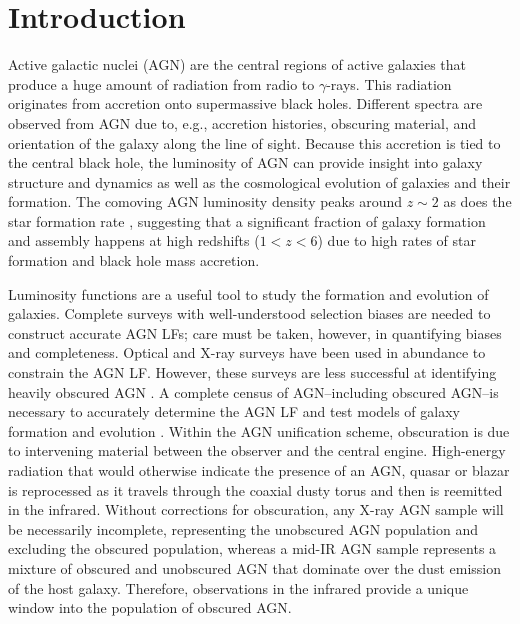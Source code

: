 \documentclass[twocolumn, trackchanges]{aastex63}
\begin{document}
\section{Introduction}
\label{sec:intro}
Active galactic nuclei (AGN) are the central regions of active galaxies that produce a huge amount of radiation from radio to $\gamma$-rays.
This radiation originates from accretion onto supermassive black holes. 
Different spectra are observed from AGN due to, e.g., accretion histories, obscuring material, and orientation of the galaxy along the line of sight.
Because this accretion is tied to the central black hole, the luminosity of AGN can provide insight into galaxy structure and dynamics as well as the cosmological evolution of galaxies and their formation.
The comoving AGN luminosity density peaks around $z\sim 2$ \citep[e.g.,][]{aird_evolution_2010} as does the star formation rate \citep[e.g.,][]{madau_cosmic_2015}, suggesting that a significant fraction of galaxy formation and assembly happens at high redshifts ($1 < z < 6$) due to high rates of star formation and black hole mass accretion.

Luminosity functions are a useful tool to study the formation and evolution of galaxies.
Complete surveys with well-understood selection biases are needed to construct accurate AGN LFs; care must be taken, however, in quantifying biases and completeness.
Optical and X-ray surveys have been used in abundance to constrain the AGN LF.
However, these surveys are less successful at identifying heavily obscured AGN \citep{hickox_obscured_2018}.
A complete census of AGN--including obscured AGN--is necessary to accurately determine the AGN LF and test models of galaxy formation and evolution \citep{shen_bolometric_2020}.
Within the AGN unification scheme, obscuration is due to intervening material between the observer and the central engine.
High-energy radiation that would otherwise indicate the presence of an AGN, quasar or blazar is reprocessed as it travels through the coaxial dusty torus and then is reemitted in the infrared.
Without corrections for obscuration, any X-ray AGN sample will be necessarily incomplete, representing the unobscured AGN population and excluding the obscured population, whereas a mid-IR AGN sample represents a mixture of obscured and unobscured AGN that dominate over the dust emission of the host galaxy.
Therefore, observations in the infrared provide a unique window into the population of obscured AGN.
\end{document}
